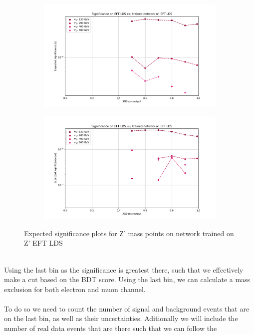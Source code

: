 \documentclass[12pt, a4paper]{book}
\begin{document}
\begin{figure}[!ht]
	\centering
	\begin{subfigure}[b]{0.49\textwidth}
      \centering
      \includegraphics[width=1\textwidth]{XGBoost/EFT_LDS/EXP_SIG_ee.pdf}
      \end{subfigure}
   \hfill
   \begin{subfigure}[b]{0.49\textwidth}
      \centering
      \includegraphics[width=1\textwidth]{XGBoost/EFT_LDS/EXP_SIG_uu.pdf}
      \end{subfigure}
   \caption{Expected significance plots for Z' mass points on network trained on Z' EFT LDS}\label{fig:EFT_LDS_exp_sig}
\end{figure}
\\Using the last bin as the significance is greatest there, such that we effectively make a cut based on the BDT score. Using the last bin, we can calculate a mass exclusion for both electron and muon channel.\\
\\To do so we need to count the number of signal and background events that are on the last bin, as well as their uncertainties. Aditionally we will include the number of real data events that are there such that we can follow the 
\end{document}
